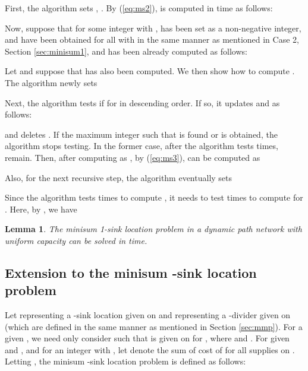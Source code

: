 \documentclass[a4paper]{llncs}
\newtheorem{lem}{Lemma}
\begin{document}
First, the algorithm sets , .
By (\ref{eq:ms2}),  is computed in  time as follows:

Now, suppose that for some integer  with ,  has been set as a non-negative integer,
 and  have been obtained for all  with  in the same manner as mentioned in Case 2, Section \ref{sec:minisum1},
and  has been already computed as follows:

Let  and suppose that  has also been computed.
We then show how to compute .
The algorithm newly sets 

Next, the algorithm tests if  for  in descending order.
If so, it updates  and  as follows:

and deletes .
If the maximum integer  such that  is found or  is obtained, the algorithm stops testing.
In the former case, after the algorithm tests  times,  remain.
Then, after computing  as ,
by (\ref{eq:ms3}),  can be computed as

Also, for the next recursive step, the algorithm eventually sets 



Since the algorithm tests  times to compute ,
it needs to test  times to compute  for .
Here, by , we have


\begin{lem}
The minisum 1-sink location problem in a dynamic path network with uniform capacity can be solved in  time.
\label{lem:ms1}
\end{lem}


\subsection{Extension to the minisum -sink location problem}
Let  representing a -sink location given on  and   representing a -divider given on 
(which are defined in the same manner as mentioned in Section \ref{sec:mmp}).
For a given , we need only consider  such that  is given on  for , where  and .
For given  and ,
and for an integer  with , let  denote the sum of cost of  for all supplies on .
Letting , the minisum -sink location problem is defined as follows:
\end{document}
